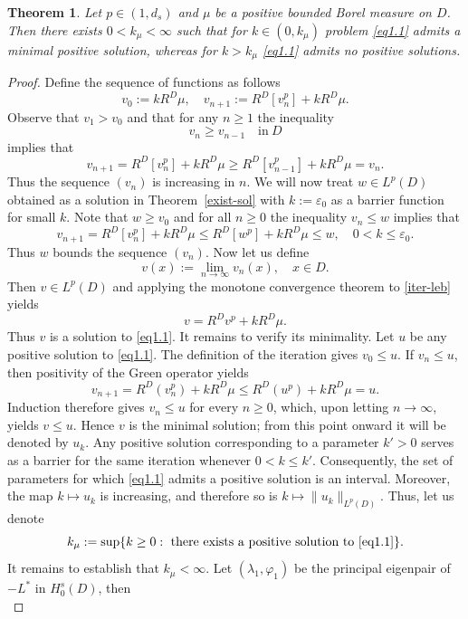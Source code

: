 \documentclass[11pt,a4paper,reqno]{amsart}
\newtheorem{theorem}{\bf Theorem}[section]
\theoremstyle{definition}
\numberwithin{equation}{section}
\begin{document}
\begin{theorem}
\label{k-star-sol}
Let $p\in(1,{d_s})$ and $\mu$ be a positive bounded Borel measure on $D$.
Then there exists $0<k_\mu<\infty$ such that for $k\in(0,k_\mu)$ problem  \eqref{eq1.1} 
admits a minimal positive solution, whereas for  $k>k_\mu$ \eqref{eq1.1} admits no positive  solutions.
\end{theorem}
\begin{proof}
Define the sequence of functions as follows
\begin{equation}
\label{iter-leb}
v_0:=kR^D\mu,\quad v_{n+1}:=R^D[v_n^p]+kR^D\mu.
\end{equation}
Observe that $v_1>v_0$ and that for any $n\geq1$ the inequality
\[
v_n\geq v_{n-1}\quad\text{in}\ D
\]
implies that
\[
v_{n+1}=R^D[v_n^p]+kR^D\mu\geq R^D[v_{n-1}^p]+kR^D\mu=v_n.
\]
Thus the sequence $(v_n)$ is increasing in  $n$. 
We will now treat $w\in L^p(D)$ obtained as a solution in Theorem~\ref{exist-sol} with $k:=\varepsilon_0$ 
as a barrier function for small $k$. Note that $w\geq v_0$ and for all $n\geq0$ the inequality $v_n\leq w$ implies that
\[
v_{n+1}=R^D[v_n^p]+kR^D\mu\leq R^D[w^p]+kR^D\mu\leq w,\quad 0<k\leq \varepsilon_0.
\] 
Thus $w$  bounds the sequence $(v_n)$. Now let us define
\[
v(x):=\lim_{n\to\infty}v_n(x),\quad x\in D.
\]
Then $v\in L^p(D)$ and applying the monotone convergence theorem to  
\eqref{iter-leb} yields
\[
v=R^Dv^p+kR^D\mu.
\]
Thus \(v\) is a solution to \eqref{eq1.1}.
It remains to verify its minimality. 
Let \(u\) be any positive solution to \eqref{eq1.1}. 
The definition of the iteration gives \(v_0\leq u\). 
If \(v_n\leq u\), then positivity of the Green operator yields 
\[
v_{n+1} = R^D(v_n^p)+kR^D\mu \leq R^D(u^p)+kR^D\mu = u. 
\]
Induction therefore gives \(v_n\leq u\) for every \(n\geq0\), which, upon letting $n\to\infty$, yields
$v\leq u$.  Hence \(v\) is the minimal solution; from this point onward it will be denoted by \(u_k\). 
Any positive solution corresponding to a parameter \(k'>0\) serves as a barrier for the same iteration whenever 
\(0<k\leq k'\). Consequently, the set of parameters for which \eqref{eq1.1} admits a positive solution is an interval. 
Moreover, the map \(k\mapsto u_k\) is increasing, and therefore so is \(k\mapsto\|u_k\|_{L^p(D)}\).
Thus, let us  denote
\[
k_\mu:=\sup\{k\ge 0: \text{ there exists a positive solution to }\eqref{eq1.1}\}.
\]
It remains to establish that $k_\mu<\infty$. 
Let $(\lambda_1,\varphi_1)$ be the principal eigenpair of $-L^*$ in $H^s_0(D)$, then
\begin{equation}
\label{eq-eigen}

\end{equation}
\end{proof}
\end{document}

